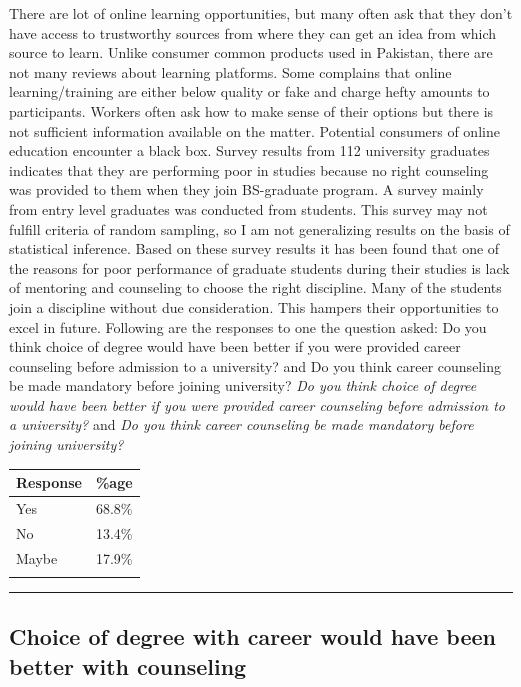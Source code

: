 \documentclass[
  12pt]{article}
\begin{document}
There are lot of online learning opportunities, but many often ask that
they don't have access to trustworthy sources from where they can get an
idea from which source to learn. Unlike consumer common products used in
Pakistan, there are not many reviews about learning platforms. Some
complains that online learning/training are either below quality or fake
and charge hefty amounts to participants. Workers often ask how to make
sense of their options but there is not sufficient information available
on the matter. Potential consumers of online education encounter a black
box. Survey results from 112 university graduates indicates that they
are performing poor in studies because no right counseling was provided
to them when they join BS-graduate program. A survey mainly from entry
level graduates was conducted from students. This survey may not fulfill
criteria of random sampling, so I am not generalizing results on the
basis of statistical inference. Based on these survey results it has
been found that one of the reasons for poor performance of graduate
students during their studies is lack of mentoring and counseling to
choose the right discipline. Many of the students join a discipline
without due consideration. This hampers their opportunities to excel in
future. Following are the responses to one the question asked: Do you
think choice of degree would have been better if you were provided
career counseling before admission to a university? and Do you think
career counseling be made mandatory before joining university? \emph{Do
you think choice of degree would have been better if you were provided
career counseling before admission to a university?} and \emph{Do you
think career counseling be made mandatory before joining university?}

\begin{longtable}[]{@{}ll@{}}
\toprule()
Response & \%age \\
\midrule()
\endhead
Yes & 68.8\% \\
No & 13.4\% \\
Maybe & 17.9\% \\
& \\
\bottomrule()
\end{longtable}

\begin{center}\rule{0.5\linewidth}{0.5pt}\end{center}

\hypertarget{choice-of-degree-with-career-would-have-been-better-with-counseling}{%
\subsection{Choice of degree with career would have been better with
counseling}\label{choice-of-degree-with-career-would-have-been-better-with-counseling}}
\end{document}
